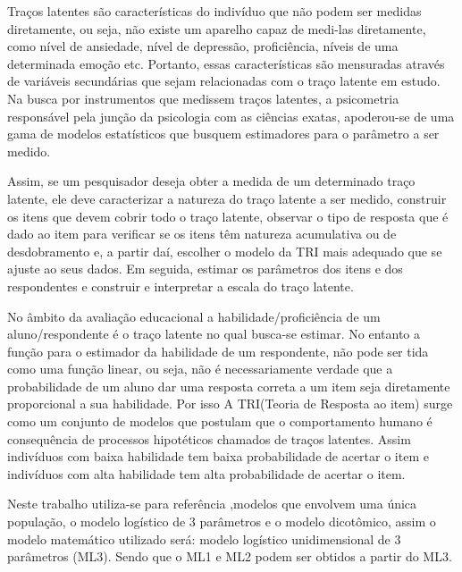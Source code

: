 	 \par
		Traços latentes são características do indivíduo que não podem ser medidas diretamente, ou seja, não existe um aparelho capaz de medi-las diretamente, como nível de ansiedade, nível de depressão, proficiência, níveis de uma determinada emoção etc. Portanto, essas características são mensuradas através de variáveis secundárias que sejam relacionadas com o traço latente em estudo. Na busca por instrumentos que medissem traços latentes, a psicometria responsável pela junção da psicologia com as ciências exatas, apoderou-se de uma gama de modelos estatísticos que busquem estimadores para o parâmetro a ser medido.
	\par
	  
	    Assim, se um pesquisador deseja obter a medida de um determinado traço latente, ele deve caracterizar a natureza do traço latente a ser medido, construir os itens que devem cobrir todo o traço latente, observar o tipo de resposta que é dado ao item para verificar se os itens têm natureza acumulativa ou de desdobramento e, a partir daí, escolher o modelo da TRI mais adequado que se ajuste ao seus dados. Em seguida, estimar os parâmetros dos itens e dos respondentes e construir e interpretar a escala do traço latente.
	\par
	    No âmbito da avaliação educacional a habilidade/proficiência de um aluno/respondente é o  traço latente no qual busca-se estimar. No entanto a função para o estimador da  habilidade de um respondente, não pode ser tida como uma função linear, ou seja, não é necessariamente verdade que a probabilidade de um aluno dar uma resposta correta a um item seja diretamente proporcional a sua habilidade. Por isso  A TRI(Teoria de Resposta ao item) surge como um conjunto de modelos que postulam que o comportamento humano é consequência de processos hipotéticos chamados de traços latentes. Assim indivíduos com baixa habilidade tem baixa probabilidade de acertar o item e indivíduos com alta habilidade tem alta probabilidade de acertar o item.\cite{Pasquali}
	\par
    	Neste trabalho utiliza-se para referência ,modelos que envolvem uma única população, o modelo logístico de 3 parâmetros e o modelo dicotômico, assim o modelo matemático utilizado será: modelo logístico unidimensional de 3 parâmetros (ML3). Sendo que o ML1 e ML2 podem ser obtidos a partir do ML3.
    	
    	
